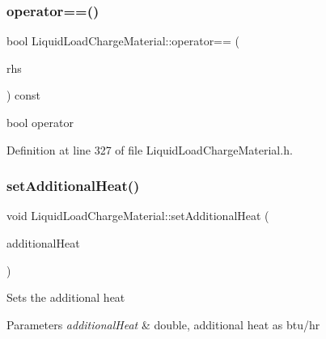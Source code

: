 \mbox{\label{class_liquid_load_charge_material_ad2090d1628f26e46339e9e164b47d3a2}} 
\subsubsection{\texorpdfstring{operator==()}{operator==()}\hspace{0.1cm}{\footnotesize\ttfamily [3/3]}}
{\footnotesize\ttfamily bool Liquid\+Load\+Charge\+Material\+::operator== (\begin{DoxyParamCaption}\item[{const \hyperlink{class_liquid_load_charge_material}{Liquid\+Load\+Charge\+Material} \&}]{rhs }\end{DoxyParamCaption}) const\hspace{0.3cm}{\ttfamily [inline]}}

bool operator 

Definition at line 327 of file Liquid\+Load\+Charge\+Material.\+h.

\mbox{\label{class_liquid_load_charge_material_a557c1f588cfb972ff0c7f748d6c2bd8f}} 
\subsubsection{\texorpdfstring{set\+Additional\+Heat()}{setAdditionalHeat()}\hspace{0.1cm}{\footnotesize\ttfamily [1/3]}}
{\footnotesize\ttfamily void Liquid\+Load\+Charge\+Material\+::set\+Additional\+Heat (\begin{DoxyParamCaption}\item[{const double}]{additional\+Heat }\end{DoxyParamCaption})\hspace{0.3cm}{\ttfamily [inline]}}

Sets the additional heat 
\begin{DoxyParams}{Parameters}
{\em additional\+Heat} & double, additional heat as btu/hr \\
\hline
\end{DoxyParams}


